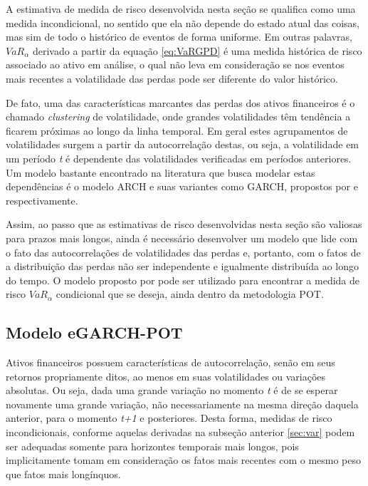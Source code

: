 \documentclass[1p]{elsarticle}
\theoremstyle{definition}
\begin{document}
A estimativa de medida de risco desenvolvida nesta seção se qualifica como uma medida incondicional, no sentido que ela não depende do estado atual das coisas, mas sim de todo o histórico de eventos de forma uniforme. Em outras palavras, $VaR_\alpha$ derivado a partir da equação \eqref{eq:VaRGPD} é uma medida histórica de risco associado ao ativo em análise, o qual não leva em consideração se nos eventos mais recentes a volatilidade das perdas pode ser diferente do valor histórico.

De fato, uma das características marcantes das perdas dos ativos financeiros é o chamado \emph{clustering} de volatilidade, onde grandes volatilidades têm tendência a ficarem próximas ao longo da linha temporal. Em geral estes agrupamentos de volatilidades surgem a partir da autocorrelação destas, ou seja, a volatilidade em um período \emph{t} é dependente das volatilidades verificadas em períodos anteriores. Um modelo bastante encontrado na literatura que busca modelar estas dependências é o modelo ARCH e suas variantes como GARCH, propostos por \cite{Engle1982} e \cite{Bollerslev1986} respectivamente.

Assim, ao passo que as estimativas de risco desenvolvidas nesta seção são valiosas para prazos mais longos, ainda é necessário desenvolver um modelo que lide com o fato das autocorrelações de volatilidades das perdas e, portanto, com o fatos de a distribuição das perdas não ser independente e igualmente distribuída ao longo do tempo. O modelo proposto por \cite{McNeil2000} pode ser utilizado para encontrar a medida de risco $VaR_\alpha$ condicional que se deseja, ainda dentro da metodologia POT.

\subsection{Modelo eGARCH-POT}
\label{sec:egarchpot}

Ativos financeiros possuem características de autocorrelação, senão em seus retornos propriamente ditos, ao menos em suas volatilidades ou variações absolutas. Ou seja, dada uma grande variação no momento \emph{t} é de se esperar novamente uma grande variação, não necessariamente na mesma direção daquela anterior, para o momento \emph{t+1} e posteriores. Desta forma, medidas de risco incondicionais, conforme aquelas derivadas na subseção anterior \ref{sec:var} podem ser adequadas somente para horizontes temporais mais longos, pois implicitamente tomam em consideração os fatos mais recentes com o mesmo peso que fatos mais longínquos.
\end{document}
